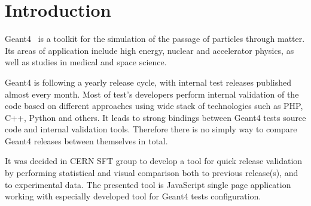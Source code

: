 \section{Introduction}
\label{sec-introduction}
Geant4~\cite{Geant4} is a toolkit for the simulation of the passage of particles through matter. Its areas of application include high energy, nuclear and accelerator physics, as well as studies in medical and space science. 

Geant4 is following a yearly release cycle, with internal test releases published almost every month.
Most of test's developers perform internal validation of the code based on different approaches using wide stack of technologies such as PHP, C++, Python and others.
It leads to strong bindings between Geant4 tests source code and internal validation tools.
Therefore there is no simply way to compare Geant4 releases between themselves in total.

It was decided in CERN SFT group to develop a tool for quick release validation by performing statistical and visual comparison both to previous release(s), and to experimental data. 
The presented tool is JavaScript single page application working with especially developed tool for Geant4 tests configuration.